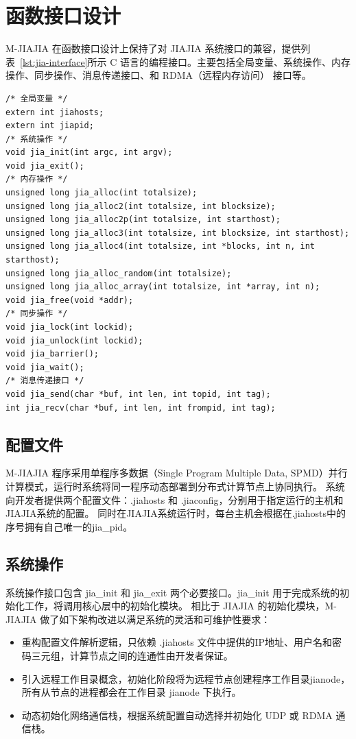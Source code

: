 {    \section{函数接口设计}\label{sec:函数接口设计}
    M-JIAJIA 在函数接口设计上保持了对 JIAJIA 系统接口的兼容，提供列表~\ref{lst:jia-interface}所示 C 语言的编程接口。主要包括全局变量、系统操作、内存操作、同步操作、消息传递接口、和 RDMA（远程内存访问） 接口等。
    \begin{lstlisting}[style=CStyle, caption={M-JIAJIA C 接口总览}, label={lst:jia-interface}]
/* 全局变量 */
extern int jiahosts;
extern int jiapid;
/* 系统操作 */
void jia_init(int argc, int argv);
void jia_exit();
/* 内存操作 */
unsigned long jia_alloc(int totalsize);
unsigned long jia_alloc2(int totalsize, int blocksize);
unsigned long jia_alloc2p(int totalsize, int starthost);
unsigned long jia_alloc3(int totalsize, int blocksize, int starthost);
unsigned long jia_alloc4(int totalsize, int *blocks, int n, int starthost);
unsigned long jia_alloc_random(int totalsize);
unsigned long jia_alloc_array(int totalsize, int *array, int n);
void jia_free(void *addr);
/* 同步操作 */
void jia_lock(int lockid);
void jia_unlock(int lockid);
void jia_barrier();
void jia_wait();
/* 消息传递接口 */
void jia_send(char *buf, int len, int topid, int tag);
int jia_recv(char *buf, int len, int frompid, int tag);
    \end{lstlisting}

    \subsection{配置文件}
    M-JIAJIA 程序采用单程序多数据（Single Program Multiple Data, SPMD）并行计算模式，运行时系统将同一程序动态部署到分布式计算节点上协同执行。
    系统向开发者提供两个配置文件：.jiahosts 和 .jiaconfig，分别用于指定运行的主机和JIAJIA系统的配置。
    同时在JIAJIA系统运行时，每台主机会根据在.jiahosts中的序号拥有自己唯一的jia\_pid。

    \subsection{系统操作}\label{sec:init}
    系统操作接口包含 jia\_init 和 jia\_exit 两个必要接口。jia\_init 用于完成系统的初始化工作，将调用核心层中的初始化模块。
    相比于 JIAJIA 的初始化模块，M-JIAJIA 做了如下架构改进以满足系统的灵活和可维护性要求：
    \begin{itemize}
        \item 重构配置文件解析逻辑，只依赖 .jiahosts 文件中提供的IP地址、用户名和密码三元组，计算节点之间的连通性由开发者保证。
        \item 引入远程工作目录概念，初始化阶段将为远程节点创建程序工作目录jianode，所有从节点的进程都会在工作目录 jianode 下执行。
        \item 动态初始化网络通信栈，根据系统配置自动选择并初始化 UDP 或 RDMA 通信栈。
    \end{itemize}

}
